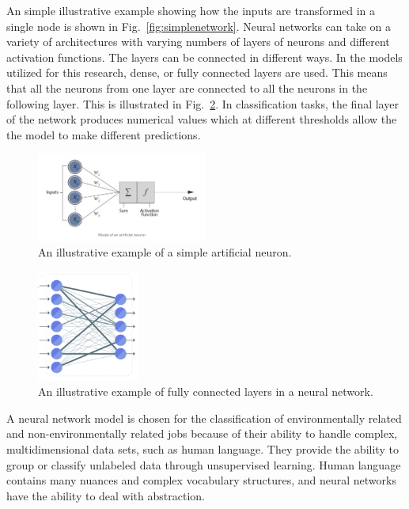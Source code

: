 An simple illustrative example showing how the inputs are transformed in a single node is shown in Fig.~\ref{fig:simplenetwork}. Neural networks can take on a variety of architectures with varying numbers of layers of neurons and different activation functions. The layers can be connected in different ways. In the models utilized for this research, dense, or fully connected layers are used. This means that all the neurons from one layer are connected to all the neurons in the following layer. This is illustrated in Fig.~\ref{fig:fullyconnected}. In classification tasks, the final layer of the network produces numerical values which at different thresholds allow the the model to make different predictions. 

\begin{figure}[htbp]
  \centering
    \includegraphics[width=0.5\textwidth]{figures/SimpleNeuron.pdf}
    \caption{
    An illustrative example of a simple artificial neuron.
    }
\label{fig:simpleneuron}
\end{figure}



\begin{figure}[htbp]
  \centering
    \includegraphics[width=0.3\textwidth]{figures/FullyConnected.pdf}
    \caption{
    An illustrative example of fully connected layers in a neural network.
    }
\label{fig:fullyconnected}
\end{figure}

A neural network model is chosen for the classification of environmentally related and non-environmentally related jobs because of their ability to handle complex, multidimensional data sets, such as human language. They provide the ability to group or classify unlabeled data through unsupervised learning. Human language contains many nuances and complex vocabulary structures, and neural networks have the ability to deal with abstraction.  

